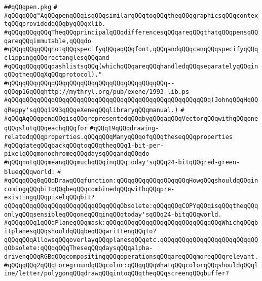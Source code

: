 \label{src/lib/x-kit/xclient/src/window/pen.pkg}
\verb|##qQQqpen.pkg|\newline
\verb|#|\newline
\verb|#qQQqqQQq"AqQQqpenqQQqisqQQqsimilarqQQqtoqQQqtheqQQqgraphicsqQQqcontextqQQqprovidedqQQqbyqQQqxlib.|\newline
\verb|#qQQqqQQqqQQqTheqQQqprincipalqQQqdifferencesqQQqareqQQqthatqQQqpensqQQqareqQQqimmutable,qQQqdo|\newline
\verb|#qQQqqQQqqQQqnotqQQqspecifyqQQqaqQQqfont,qQQqandqQQqcanqQQqspecifyqQQqclippingqQQqrectanglesqQQqand|\newline
\verb|#qQQqqQQqqQQqdashlistsqQQq(whichqQQqareqQQqhandledqQQqseparatelyqQQqinqQQqtheqQQqXqQQqprotocol)."|\newline
\verb|#qQQqqQQqqQQqqQQqqQQqqQQqqQQqqQQqqQQqqQQqqQQq--qQQqp16qQQqhttp://mythryl.org/pub/exene/1993-lib.ps|\newline
\verb|#qQQqqQQqqQQqqQQqqQQqqQQqqQQqqQQqqQQqqQQqqQQqqQQqqQQqqQQq(JohnqQQqHqQQqReppy'sqQQq1993qQQqeXeneqQQqlibraryqQQqmanual.)|\newline
\verb|#|\newline
\verb|#qQQqAqQQqpenqQQqisqQQqrepresentedqQQqbyqQQqaqQQqVectorqQQqwithqQQqoneqQQqslotqQQqeachqQQqfor|\newline
\verb|#qQQq19qQQqdrawing-relatedqQQqproperties.qQQqqQQqManyqQQqofqQQqtheseqQQqproperties|\newline
\verb|#qQQqdateqQQqbackqQQqtoqQQqtheqQQq1-bit-per-pixelqQQqmonochromeqQQqdaysqQQqandqQQqdo|\newline
\verb|#qQQqnotqQQqmeanqQQqmuchqQQqinqQQqtoday'sqQQq24-bitqQQqred-green-blueqQQqworld:|\newline
\verb|#|\newline
\verb|#qQQqqQQq0qQQqDrawqQQqfunction:qQQqqQQqqQQqqQQqqQQqHowqQQqshouldqQQqincomingqQQqbitqQQqbeqQQqcombinedqQQqwithqQQqpre-existingqQQqpixelqQQqbit?qQQqqQQqqQQqqQQqqQQqqQQqqQQqqQQqObsolete:qQQqqQQqCOPYqQQqisqQQqtheqQQqonlyqQQqsensibleqQQqoneqQQqinqQQqtoday'sqQQq24-bitqQQqworld.|\newline
\verb|#qQQqqQQq1qQQqPlaneqQQqmask:qQQqqQQqqQQqqQQqqQQqqQQqqQQqqQQqWhichqQQqbitplanesqQQqshouldqQQqbeqQQqwrittenqQQqto?qQQqqQQqAllowsqQQqoverlayqQQqplanesqQQqetc.qQQqqQQqqQQqqQQqqQQqqQQqqQQqObsolete:qQQqqQQqTheseqQQqdaysqQQqalpha-drivenqQQqRGBqQQqcompositingqQQqoperationsqQQqareqQQqmoreqQQqrelevant.|\newline
\verb|#qQQqqQQq2qQQqForegroundqQQqcolor:qQQqqQQqWhatqQQqcolorqQQqshouldqQQqline/letter/polygonqQQqdrawqQQqintoqQQqtheqQQqscreenqQQqbuffer?|\newline
